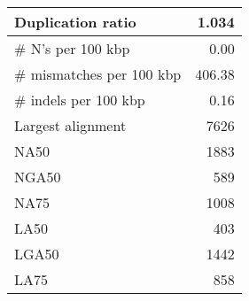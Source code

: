\documentclass[12pt,a4paper]{article}
\begin{document}
\begin{table}[ht]
\begin{center}
\begin{tabular}{|l*{1}{|r}|}
Duplication ratio & 1.034 \\ \hline
\# N's per 100 kbp & 0.00 \\ \hline
\# mismatches per 100 kbp & 406.38 \\ \hline
\# indels per 100 kbp & 0.16 \\ \hline
Largest alignment & 7626 \\ \hline
NA50 & 1883 \\ \hline
NGA50 & 589 \\ \hline
NA75 & 1008 \\ \hline
LA50 & 403 \\ \hline
LGA50 & 1442 \\ \hline
LA75 & 858 \\ \hline
\end{tabular}
\end{center}
\end{table}
\end{document}
